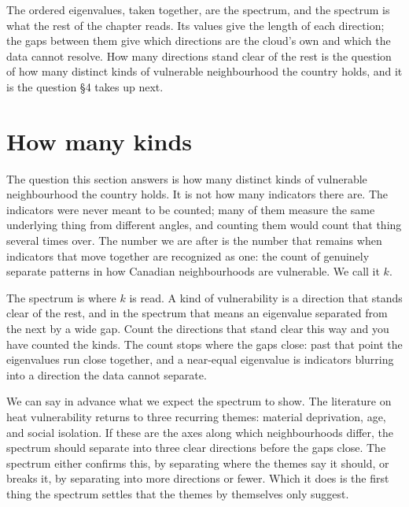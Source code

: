 The ordered eigenvalues, taken together, are the spectrum, and the spectrum is what the rest of the chapter reads. Its values give the length of each direction; the gaps between them give which directions are the cloud's own and which the data cannot resolve. How many directions stand clear of the rest is the question of how many distinct kinds of vulnerable neighbourhood the country holds, and it is the question §4 takes up next.

\section{How many kinds}

The question this section answers is how many distinct kinds of vulnerable neighbourhood the country holds. It is not how many indicators there are. The indicators were never meant to be counted; many of them measure the same underlying thing from different angles, and counting them would count that thing several times over. The number we are after is the number that remains when indicators that move together are recognized as one: the count of genuinely separate patterns in how Canadian neighbourhoods are vulnerable. We call it $k$.

The spectrum is where $k$ is read. A kind of vulnerability is a direction that stands clear of the rest, and in the spectrum that means an eigenvalue separated from the next by a wide gap. Count the directions that stand clear this way and you have counted the kinds. The count stops where the gaps close: past that point the eigenvalues run close together, and a near-equal eigenvalue is indicators blurring into a direction the data cannot separate.

We can say in advance what we expect the spectrum to show. The literature on heat vulnerability returns to three recurring themes: material deprivation, age, and social isolation.%
If these are the axes along which neighbourhoods differ, the spectrum should separate into three clear directions before the gaps close. The spectrum either confirms this, by separating where the themes say it should, or breaks it, by separating into more directions or fewer. Which it does is the first thing the spectrum settles that the themes by themselves only suggest.


